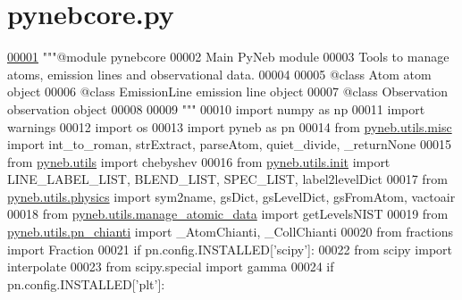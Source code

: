 \hypertarget{pynebcore_8py_source}{}\section{pynebcore.\+py}
\label{pynebcore_8py_source}

\begin{DoxyCode}
\hypertarget{pynebcore_8py_source_l00001}{}\hyperlink{namespacepyneb_1_1core_1_1pynebcore}{00001} \textcolor{stringliteral}{"""@module pynebcore}
00002 \textcolor{stringliteral}{Main PyNeb module}
00003 \textcolor{stringliteral}{Tools to manage atoms, emission lines and observational data.}
00004 \textcolor{stringliteral}{}
00005 \textcolor{stringliteral}{@class Atom           atom object}
00006 \textcolor{stringliteral}{@class EmissionLine   emission line object}
00007 \textcolor{stringliteral}{@class Observation    observation object}
00008 \textcolor{stringliteral}{}
00009 \textcolor{stringliteral}{"""}
00010 \textcolor{keyword}{import} numpy \textcolor{keyword}{as} np
00011 \textcolor{keyword}{import} warnings
00012 \textcolor{keyword}{import} os
00013 \textcolor{keyword}{import} pyneb \textcolor{keyword}{as} pn
00014 \textcolor{keyword}{from} \hyperlink{namespacepyneb_1_1utils_1_1misc}{pyneb.utils.misc} \textcolor{keyword}{import} int\_to\_roman, strExtract, parseAtom, quiet\_divide, \_returnNone
00015 \textcolor{keyword}{from} \hyperlink{namespacepyneb_1_1utils}{pyneb.utils} \textcolor{keyword}{import} chebyshev
00016 \textcolor{keyword}{from} \hyperlink{namespacepyneb_1_1utils_1_1init}{pyneb.utils.init} \textcolor{keyword}{import} LINE\_LABEL\_LIST, BLEND\_LIST, SPEC\_LIST, label2levelDict
00017 \textcolor{keyword}{from} \hyperlink{namespacepyneb_1_1utils_1_1physics}{pyneb.utils.physics} \textcolor{keyword}{import} sym2name, gsDict, gsLevelDict, gsFromAtom, vactoair
00018 \textcolor{keyword}{from} \hyperlink{namespacepyneb_1_1utils_1_1manage__atomic__data}{pyneb.utils.manage\_atomic\_data} \textcolor{keyword}{import} getLevelsNIST
00019 \textcolor{keyword}{from} \hyperlink{namespacepyneb_1_1utils_1_1pn__chianti}{pyneb.utils.pn\_chianti} \textcolor{keyword}{import} \_AtomChianti, \_CollChianti
00020 \textcolor{keyword}{from} fractions \textcolor{keyword}{import} Fraction
00021 \textcolor{keywordflow}{if} pn.config.INSTALLED[\textcolor{stringliteral}{'scipy'}]:
00022     \textcolor{keyword}{from} scipy \textcolor{keyword}{import} interpolate
00023     \textcolor{keyword}{from} scipy.special \textcolor{keyword}{import} gamma
00024 \textcolor{keywordflow}{if} pn.config.INSTALLED[\textcolor{stringliteral}{'plt'}]: 

\end{DoxyCode}
